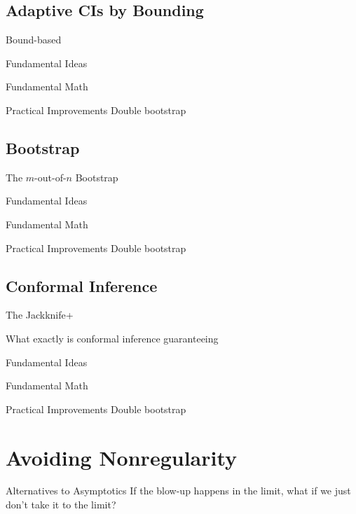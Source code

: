 \documentclass[aspectratio=169, professionalfonts]{beamer}
\begin{document}
\subsection{Adaptive CIs by Bounding}
\begin{frame}{Bound-based}
\end{frame}
\begin{frame}{Fundamental Ideas}
\end{frame}
\begin{frame}{Fundamental Math}
\end{frame}
\begin{frame}{Practical Improvements}
	Double bootstrap
\end{frame}

\subsection{\mon Bootstrap}
\begin{frame}{The $m$-out-of-$n$ Bootstrap}
\end{frame}
\begin{frame}{Fundamental Ideas}
\end{frame}
\begin{frame}{Fundamental Math}
\end{frame}
\begin{frame}{Practical Improvements}
	Double bootstrap
\end{frame}


\subsection{Conformal Inference}
\begin{frame}{The Jackknife+}
\end{frame}
\begin{frame}{What exactly is conformal inference guaranteeing}
\end{frame}
\begin{frame}{Fundamental Ideas}
\end{frame}
\begin{frame}{Fundamental Math}
\end{frame}
\begin{frame}{Practical Improvements}
	Double bootstrap
\end{frame}



\section{Avoiding Nonregularity}
\begin{frame}{Alternatives to Asymptotics}
	If the blow-up happens in the limit, what if we just don't take it to the limit?
\end{frame}
\end{document}
